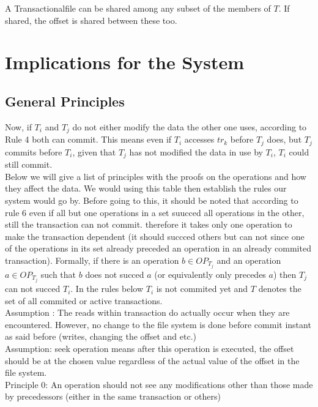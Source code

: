 \documentclass[a4paper, 11pt]{article}
\begin{document}
A Transactionalfile can be shared among any subset of the members of $T$. If shared, the offset is shared between these too. 

\section{Implications for the System}

\subsection{General Principles}
Now, if $T_i$ and $T_j$ do not either modify the data the other one uses, according to Rule 4 both can commit. This means even if $T_i$ accesses $tr_k$ before $T_j$ does, but $T_j$ commits before $T_i$, given that $T_j$ has not modified the data in use by $T_i$, $T_i$ could still commit. \\


Below we will give a list of principles with the proofs on the operations and how they affect the data. We would using this table then establish the rules our system would go by. Before going to this, it should be noted that according to rule 6 even if all but one operations in a set suucced all operations in the other, still the transaction can not commit. therefore it takes only one operation to make the transaction dependent (it should succced others but can not since one of the operations in its set already preceded an operation in an already commited transaction). Formally, if there is an operation $b \in OP_{T_j}$ and an operation $a \in OP_{T_j}$ such that $b$ does not succed $a$ (or equivalently only precedes $a$) then $T_j$ can not succed $T_i$. In the rules below $T_i$ is not commited yet and $T$ denotes the set of all commited or active transactions. \\

Assumption : The reads within transaction do actually occur when they are encountered. However, no change to the file system is done before commit instant as said before (writes, changing the offset and etc.)\\


Assumption: seek operation means after this operation is executed, the offset should be at the chosen value regardless of the actual value of the offset in the file system.\\

Principle 0: An operation should not see any modifications other than those made by precedessors (either in the same transaction or others)\\
\end{document}
